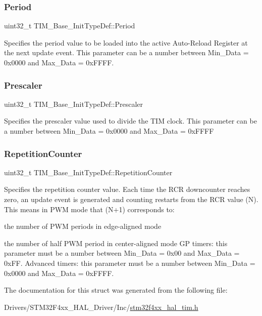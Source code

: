 \subsubsection{\texorpdfstring{Period}{Period}}
{\footnotesize\ttfamily uint32\+\_\+t T\+I\+M\+\_\+\+Base\+\_\+\+Init\+Type\+Def\+::\+Period}

Specifies the period value to be loaded into the active Auto-\/\+Reload Register at the next update event. This parameter can be a number between Min\+\_\+\+Data = 0x0000 and Max\+\_\+\+Data = 0x\+F\+F\+FF. \mbox{\label{struct_t_i_m___base___init_type_def_afc886119e6709bb576d25b5cf8d12d92}} 
\subsubsection{\texorpdfstring{Prescaler}{Prescaler}}
{\footnotesize\ttfamily uint32\+\_\+t T\+I\+M\+\_\+\+Base\+\_\+\+Init\+Type\+Def\+::\+Prescaler}

Specifies the prescaler value used to divide the T\+IM clock. This parameter can be a number between Min\+\_\+\+Data = 0x0000 and Max\+\_\+\+Data = 0x\+F\+F\+FF \mbox{\label{struct_t_i_m___base___init_type_def_aa949328175500fd1d112f64a4db5ae79}} 
\subsubsection{\texorpdfstring{Repetition\+Counter}{RepetitionCounter}}
{\footnotesize\ttfamily uint32\+\_\+t T\+I\+M\+\_\+\+Base\+\_\+\+Init\+Type\+Def\+::\+Repetition\+Counter}

Specifies the repetition counter value. Each time the R\+CR downcounter reaches zero, an update event is generated and counting restarts from the R\+CR value (N). This means in P\+WM mode that (N+1) corresponds to\+:
\begin{DoxyItemize}
\item the number of P\+WM periods in edge-\/aligned mode
\item the number of half P\+WM period in center-\/aligned mode GP timers\+: this parameter must be a number between Min\+\_\+\+Data = 0x00 and Max\+\_\+\+Data = 0x\+FF. Advanced timers\+: this parameter must be a number between Min\+\_\+\+Data = 0x0000 and Max\+\_\+\+Data = 0x\+F\+F\+FF. 
\end{DoxyItemize}

The documentation for this struct was generated from the following file\+:\begin{DoxyCompactItemize}
\item 
Drivers/\+S\+T\+M32\+F4xx\+\_\+\+H\+A\+L\+\_\+\+Driver/\+Inc/\hyperlink{stm32f4xx__hal__tim_8h}{stm32f4xx\+\_\+hal\+\_\+tim.\+h}\end{DoxyCompactItemize}
